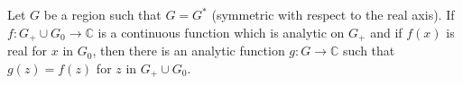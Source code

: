 Let $G$ be a region such that $G = G^*$ (symmetric with respect to the real axis). If $f: G_+ \cup G_0 \to \mathbb{C}$ is a continuous function which is analytic on $G_+$ and if $f(x)$ is real for $x$ in $G_0$, then there is an analytic function $g: G \to \mathbb{C}$ such that $g(z) = f(z)$ for $z$ in $G_+ \cup G_0$.